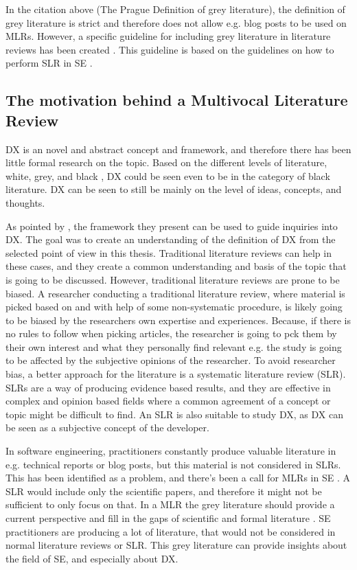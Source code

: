 \documentclass[english, 12pt, a4paper, sci, utf8, a-1b, online]{aaltothesis}
\begin{document}
In the citation above (The Prague Definition of grey literature), the definition of grey literature is strict and therefore does not allow e.g. blog posts to be used on MLRs. However, a specific guideline for including grey literature in literature reviews has been created \parencite{guidelines-for-MLR}. This guideline is based on the guidelines on how to perform SLR in SE \parencite{guidelines-for-SLR-in-SE}.

\subsection{The motivation behind a Multivocal Literature Review}

DX is an novel and abstract concept and framework, and therefore there has been little formal research on the topic. Based on the different levels of literature, white, grey, and black \parencite{guidelines-for-MLR}, DX could be seen even to be in the category of black literature. DX can be seen to still be mainly on the level of ideas, concepts, and thoughts.

As pointed by \textcite{fagerholm-doctoral-thesis}, the framework they present can be used to guide inquiries into DX. The goal was to create an understanding of the definition of DX from the selected point of view in this thesis. Traditional literature reviews can help in these cases, and they create a common understanding and basis of the topic that is going to be discussed. However, traditional literature reviews are prone to be biased. A researcher conducting a traditional literature review, where material is picked based on and with help of some non-systematic procedure, is likely going to be biased by the researchers own expertise and experiences. Because, if there is no rules to follow when picking articles, the researcher is going to pck them by their own interest and what they personally find relevant e.g. the study is going to be affected by the subjective opinions of the researcher. To avoid researcher bias, a better approach for the literature is a systematic literature review (SLR). SLRs are a way of producing evidence based results, and they are effective in complex and opinion based fields where a common agreement of a concept or topic might be difficult to find. An SLR is also suitable to study DX, as DX can be seen as a subjective concept of the developer.

In software engineering, practitioners constantly produce valuable literature in e.g. technical reports or blog posts, but this material is not considered in SLRs. This has been identified as a problem, and there's been a call for MLRs in SE \parencite{the-need-for-MLR}. A SLR would include only the scientific papers, and therefore it might not be sufficient to only focus on that. In a MLR the grey literature should provide a current perspective and fill in the gaps of scientific and formal literature \parencite{guidelines-for-MLR}. SE practitioners are producing a lot of literature, that would not be considered in normal literature reviews or SLR. This grey literature can provide insights about the field of SE, and especially about DX.
\end{document}
